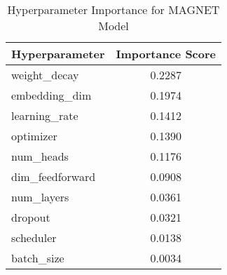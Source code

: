 \begin{table}[h]
\centering
\caption{Hyperparameter Importance for MAGNET Model}
\label{tab:param_importance}
\begin{tabular}{lc}
\toprule
Hyperparameter & Importance Score \\
\midrule
weight\_decay & 0.2287 \\
embedding\_dim & 0.1974 \\
learning\_rate & 0.1412 \\
optimizer & 0.1390 \\
num\_heads & 0.1176 \\
dim\_feedforward & 0.0908 \\
num\_layers & 0.0361 \\
dropout & 0.0321 \\
scheduler & 0.0138 \\
batch\_size & 0.0034 \\
\bottomrule
\end{tabular}
\end{table}
